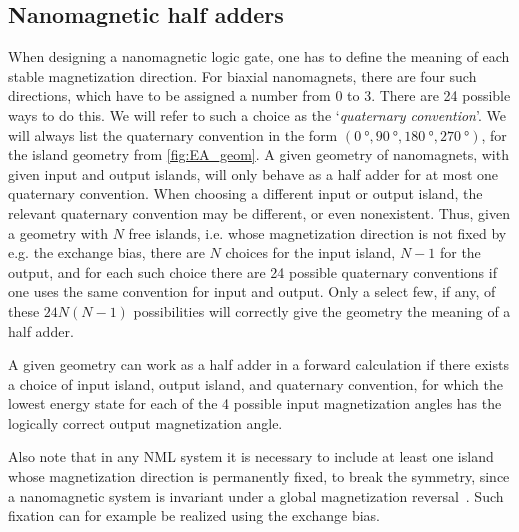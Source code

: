 \documentclass[twocolumn]{phdsymp}
\begin{document}
\subsection{Nanomagnetic half adders}
When designing a nanomagnetic logic gate, one has to define the meaning of each stable magnetization direction. For biaxial nanomagnets, there are four such directions, which have to be assigned a number from 0 to 3. There are 24 possible ways to do this. We will refer to such a choice as the `\textit{quaternary convention}'. We will always list the quaternary convention in the form $(\SI{0}{\degree}, \SI{90}{\degree}, \SI{180}{\degree}, \SI{270}{\degree})$, for the island geometry from \cref{fig:EA_geom}. A given geometry of nanomagnets, with given input and output islands, will only behave as a half adder for at most one quaternary convention. When choosing a different input or output island, the relevant quaternary convention may be different, or even nonexistent. Thus, given a geometry with $N$ free islands, i.e. whose magnetization direction is not fixed by e.g. the exchange bias, there are $N$ choices for the input island, $N-1$ for the output, and for each such choice there are 24 possible quaternary conventions if one uses the same convention for input and output. Only a select few, if any, of these $24N(N-1)$ possibilities will correctly give the geometry the meaning of a half adder. \par
A given geometry can work as a half adder in a forward calculation if there exists a choice of input island, output island, and quaternary convention, for which the lowest energy state for each of the 4 possible input magnetization angles has the logically correct output magnetization angle. \par
Also note that in any NML system it is necessary to include at least one island whose magnetization direction is permanently fixed, to break the symmetry, since a nanomagnetic system is invariant under a global magnetization reversal~\cite{GYP-18}. Such fixation can for example be realized using the exchange bias.
\end{document}

